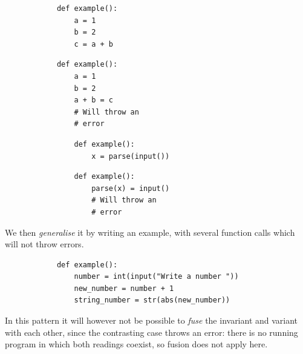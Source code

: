 \begin{enumerate}
            \hfill
     \begin{minipage}[t]{0.45\columnwidth}
        \begin{verbatim}
            def example():
                a = 1
                b = 2
                c = a + b  
        \end{verbatim}
    \end{minipage}
\hfill
    \begin{minipage}[t]{0.45\columnwidth}
        \begin{verbatim}
            def example():
                a = 1
                b = 2
                a + b = c 
                # Will throw an 
                # error  
        \end{verbatim}
    \end{minipage}
\hfill
\vspace{5pt}
\hfill 
        \begin{minipage}[t]{0.45\columnwidth}
            \begin{verbatim}
                def example():
                    x = parse(input())
            \end{verbatim}
        \end{minipage}
        \hfill
        \begin{minipage}[t]{0.45\columnwidth}
            \begin{verbatim}
                def example():
                    parse(x) = input() 
                    # Will throw an 
                    # error
            \end{verbatim}
        \end{minipage}
        \hfill
      
      We then \emph{generalise} it by writing an example, with several 
function calls which will not throw errors. 

        \begin{verbatim}
            def example():
                number = int(input("Write a number "))
                new_number = number + 1
                string_number = str(abs(new_number))
        \end{verbatim}
\hfill
      
      In this pattern it will however not be possible to \emph{fuse} the
invariant and variant with each other, since the contrasting case throws an
error: there is no running program in which both readings coexist, so fusion
does not apply here.
\end{enumerate}


